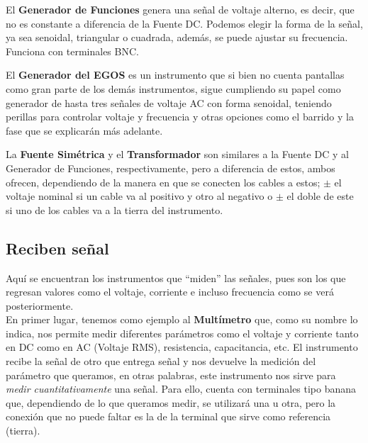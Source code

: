 \documentclass{replab}
\begin{document}
		El \textbf{Generador de Funciones} genera una señal de voltaje alterno, es decir, que no es constante a diferencia de la Fuente DC.
		Podemos elegir la forma de la señal, ya sea senoidal, triangular o cuadrada, además, se puede ajustar su frecuencia. Funciona con terminales BNC.

		El \textbf{Generador del EGOS} es un instrumento que si bien no cuenta pantallas
		como gran parte de los demás instrumentos, sigue cumpliendo su papel como generador de hasta tres señales de voltaje AC con forma
		senoidal, teniendo perillas para controlar voltaje y frecuencia y otras opciones como el barrido y la fase que se explicarán más adelante.
		
		La \textbf{Fuente Simétrica} y el \textbf{Transformador} son similares a la Fuente DC y al Generador de Funciones, respectivamente, pero
		a diferencia de estos, ambos ofrecen, dependiendo de la manera en que se conecten los cables a estos; $\pm$ el voltaje nominal si un cable va al
		positivo y otro al negativo o $\pm$ el doble de este si uno de los cables va a la tierra del instrumento.
		
		\subsection{Reciben señal}
		Aquí se encuentran los instrumentos que ``miden'' las señales, pues son los que regresan valores como el voltaje, corriente e incluso frecuencia
		como se verá posteriormente.\\
		En primer lugar, tenemos como ejemplo al \textbf{Multímetro} que, como su nombre lo indica, nos permite medir diferentes parámetros
		como el voltaje y corriente tanto en DC como en AC (Voltaje RMS), resistencia, capacitancia, etc. El instrumento recibe la señal de
		otro que entrega señal y nos devuelve la medición del parámetro que queramos, en otras palabras, este instrumento nos sirve para
		\textit{medir cuantitativamente} una señal. Para ello, cuenta con terminales tipo banana que, dependiendo de lo que queramos medir,
		se utilizará una u otra, pero la conexión que no puede faltar es la de la terminal que sirve como referencia (tierra).\\
\end{document}
